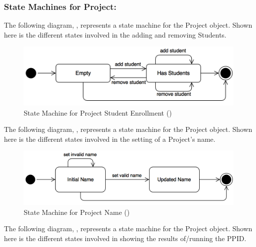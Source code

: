\documentclass[12pt,letterpaper]{article}
\begin{document}
\subsubsection*{State Machines for Project:}

The following diagram, , represents a state machine for the Project object. Shown here is the different states involved in the adding and removing Students.

\begin{figure}[H]
	\centering{}
	\includegraphics[scale=0.3]{imgs/state/project-enrollment.png}
	\caption[ - State Machine for Project Student Enrollment]{State Machine for Project Student Enrollment ()}
\end{figure}

\noindent The following diagram, , represents a state machine for the Project object. Shown here is the different states involved in the setting of a Project's name.

\begin{figure}[H]
	\centering{}
	\includegraphics[scale=0.3]{imgs/state/project-name.png}
	\caption[ - State Machine for Project Name]{State Machine for Project Name ()}
\end{figure}

\noindent The following diagram, , represents a state machine for the Project object. Shown here is the different states involved in showing the results of/running the PPID.
\end{document}
